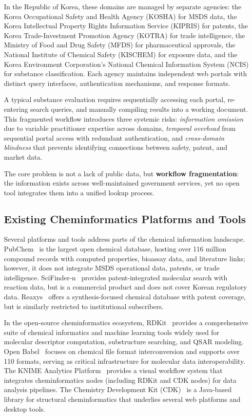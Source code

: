 \documentclass[10pt]{article}
\begin{document}
In the Republic of Korea, these domains are managed by separate agencies: the Korea Occupational Safety and Health Agency (KOSHA) for MSDS data, the Korea Intellectual Property Rights Information Service (KIPRIS) for patents, the Korea Trade-Investment Promotion Agency (KOTRA) for trade intelligence, the Ministry of Food and Drug Safety (MFDS) for pharmaceutical approvals, the National Institute of Chemical Safety (KISCHEM) for exposure data, and the Korea Environment Corporation's National Chemical Information System (NCIS) for substance classification.
Each agency maintains independent web portals with distinct query interfaces, authentication mechanisms, and response formats.

A typical substance evaluation requires sequentially accessing each portal, re-entering search queries, and manually compiling results into a working document.
This fragmented workflow introduces three systemic risks: \emph{information omission} due to variable practitioner expertise across domains, \emph{temporal overhead} from sequential portal access with redundant authentication, and \emph{cross-domain blindness} that prevents identifying connections between safety, patent, and market data.

The core problem is not a lack of public data, but \textbf{workflow fragmentation}: the information exists across well-maintained government services, yet no open tool integrates them into a unified lookup process.

\subsection{Existing Cheminformatics Platforms and Tools}

Several platforms and tools address parts of the chemical information landscape.
PubChem~\cite{pubchem_2023} is the largest open chemical database, hosting over 116 million compound records with computed properties, bioassay data, and literature links; however, it does not integrate MSDS operational data, patents, or trade intelligence.
SciFinder-n~\cite{scifinder} provides patent-integrated molecular search with reaction data, but is a commercial product and does not cover Korean regulatory data.
Reaxys~\cite{reaxys} offers a synthesis-focused chemical database with patent coverage, but is similarly restricted to institutional subscribers.

In the open-source cheminformatics ecosystem, RDKit~\cite{rdkit} provides a comprehensive suite of chemical informatics and machine learning tools widely used for molecular descriptor computation, substructure searching, and QSAR modeling.
Open Babel~\cite{openbabel} focuses on chemical file format interconversion and supports over 110 formats, serving as critical infrastructure for molecular data interoperability.
The KNIME Analytics Platform~\cite{knime} provides a visual workflow system that integrates cheminformatics nodes (including RDKit and CDK nodes) for data analysis pipelines.
The Chemistry Development Kit (CDK)~\cite{cdk} is a Java-based library for structural cheminformatics that underlies several web platforms and desktop tools.
\end{document}
